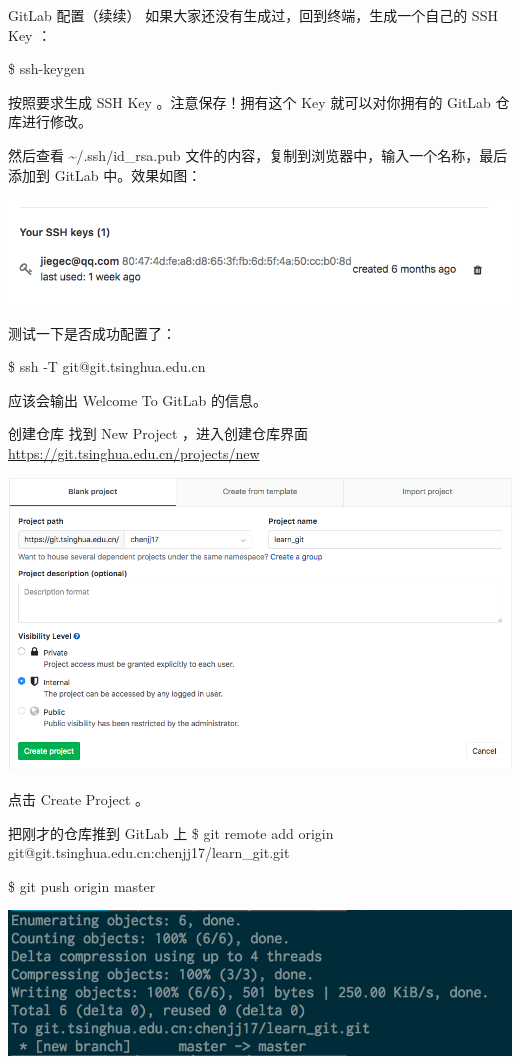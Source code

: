 \documentclass{beamer}
\begin{document}
\begin{frame}{GitLab 配置（续续）}
    如果大家还没有生成过，回到终端，生成一个自己的 SSH Key ：

    \$ ssh-keygen

    按照要求生成 SSH Key 。注意保存！拥有这个 Key 就可以对你拥有的 GitLab 仓库进行修改。

    然后查看 \~{}/.ssh/id\_rsa.pub 文件的内容，复制到浏览器中，输入一个名称，最后添加到 GitLab 中。效果如图：

    \includegraphics[width=\linewidth]{2018-10-25-11-42-06.png}

    测试一下是否成功配置了：

    \$ ssh -T git@git.tsinghua.edu.cn

    应该会输出 Welcome To GitLab 的信息。

\end{frame}

\begin{frame}{创建仓库}
    找到 New Project ，进入创建仓库界面 \url{https://git.tsinghua.edu.cn/projects/new}

    \includegraphics[width=\linewidth]{2018-10-25-11-54-08.png}

    点击 Create Project 。

\end{frame}

\begin{frame}{把刚才的仓库推到 GitLab 上}
    \$ git remote add origin git@git.tsinghua.edu.cn:chenjj17/learn\_git.git
    
    \$ git push origin master

    \includegraphics[width=\linewidth]{2018-10-25-11-59-01.png}
\end{frame}
\end{document}
